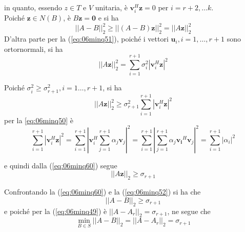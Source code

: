 \begin{thproof}
in quanto, essendo 
$z \in  T$ e $V$ unitaria, \`e $\mathbf{v}_i^{H} 
\mathbf{z} = 0$ per $i = r + 2,\ldots k$. \\
Poich\'e $\mathbf{z} \in N(B)$, \`e $B\mathbf{z}= \mathbf{0}$
e si ha
\begin{equation}
\label{eq:06minq52}
||A - B||_{2}^{2} \geq || (A - B) \mathbf{z}||_{2}^{2} = 
|| A{\mathbf{z}}||_{2}^{2}
\end{equation} 
D'altra parte per la
(\ref{eq:06minq51}), poich\'e i vettori
$\mathbf{u}_{i}, i=1, \ldots, r+1$ sono ortornormali, si ha
\begin{equation}
\label{eq:06minq60}
|| A \mathbf{z}||_{2}^{2} = \displaystyle \sum_{i=1}^{r+1}
\sigma_i^{2} |\mathbf{v}_{i}^{H}\mathbf{z}|^{2}  
\end{equation}

Poich\'e $\sigma_{i}^{2} \geq \sigma^{2}_{r+1},
i =1 \ldots, r+1$, si ha
$$ || A \mathbf{z}||_2^{2} \geq \sigma_{r+1}^{2}
\displaystyle \sum_{i=1}^{r+1} |\mathbf{v}_{i}^{H} \mathbf{z}|^{2}
$$
per la
\ref{eq:06minq50} \`e
$$
\displaystyle \sum_{i=1}^{r+1}
|\mathbf{v}_i^{H} \mathbf{z}|^{2} =
\displaystyle \sum_{i=1}^{r+1}
\left|
\mathbf{v}_{i}^{H} \displaystyle \sum_{j=1}^{r+1}
\alpha_j \mathbf{v}_j
\right|^{2}
= \displaystyle \sum_{i=1}^{r+1}
\left|
\displaystyle \sum_{j=1}^{r+1} \alpha_j
\mathbf{v_i}^{H} 
 \mathbf{v}_{j}
\right|^{2}
=
\displaystyle
\sum_{i=1}^{r+1}|\alpha_i|^{2}
$$

e quindi dalla (\ref{eq:06minq60}) segue
\begin{equation}
  \label{eq:06minq61}
   || A\mathbf{z}||_{2} \geq \sigma_{r+1}
\end{equation}

Confrontando la 
 (\ref{eq:06minq60}) e
la (\ref{eq:06minq52})
si ha che
$$
|| A - B||_{2} \geq \sigma_{r+1}
$$
e poich\'e per la 
(\ref{eq:06minq49})
\`e $||A-A_{r}||_{2} = \sigma_{r+1}$, ne segue che
$$
\min_{B \in S} ||A - B||_{2} = ||A - A_r||_2 = \sigma_{r+1}
$$
\end{thproof}

